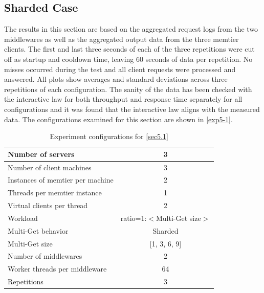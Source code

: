 \documentclass[11pt,a4paper]{article}
\begin{document}
\subsection{Sharded Case} \label{sec5.1}

The results in this section are based on the aggregated request logs from the two middlewares as well as the aggregated output data from the three memtier clients. The first and last three seconds of each of the three repetitions were cut off as startup and cooldown time, leaving 60 seconds of data per repetition. No misses occurred during the test and all client requests were processed and answered. All plots show averages and standard deviations across three repetitions of each configuration. The sanity of the data has been checked with the interactive law for both throughput and response time separately for all configurations and it was found that the interactive law aligns with the measured data. The configurations examined for this section are shown in \autoref{exp5-1}.


\begin{center}
    \begin{table}
        \centering
    	\begin{tabular}{|l|c|}
    		\hline Number of servers                & 3                       \\ 
    		\hline Number of client machines        & 3                       \\ 
    		\hline Instances of memtier per machine & 2                       \\ 
    		\hline Threads per memtier instance     & 1                       \\
    		\hline Virtual clients per thread       & 2     		            \\ 
    		\hline Workload                         & ratio=1:$<$Multi-Get size$>$             \\
    		\hline Multi-Get behavior               & Sharded                 \\
    		\hline Multi-Get size                   & [1, 3, 6, 9]            \\
    		\hline Number of middlewares            & 2                       \\
    		\hline Worker threads per middleware    & 64                      \\
    		\hline Repetitions                      & 3                       \\ 
    		\hline 
    	\end{tabular}
    	\caption{Experiment configurations for \autoref{sec5.1}} \label{exp5-1}
    \end{table}
\end{center}
\end{document}
